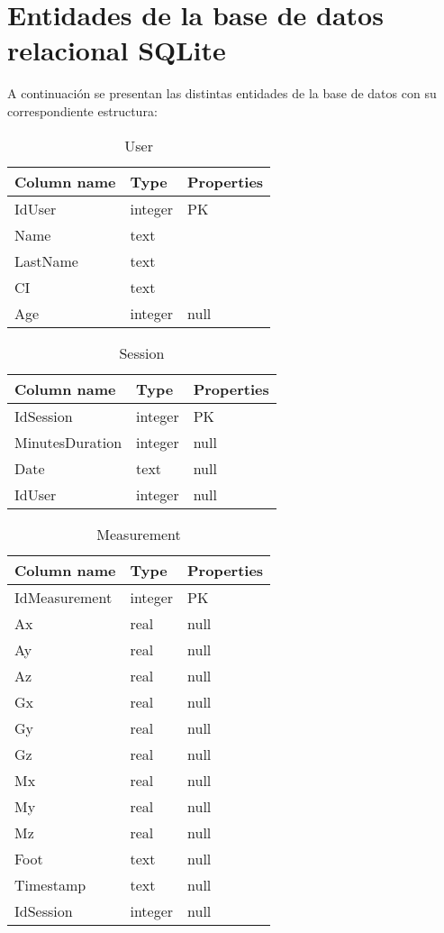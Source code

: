 \chapter{Entidades de la base de datos relacional SQLite}\label{anexo:db-tables}

A continuación se presentan las distintas entidades de la base de datos con su correspondiente estructura:

\begin{table}[H] 
\caption{User}
\centering
\begin{tabular}{| p{4cm} | p{3cm} | p{3cm}|}
\hline
\textbf{Column name} & \textbf{Type} & \textbf{Properties}  \\ \hline
IdUser & integer & PK  \\ \hline
Name & text &   \\ \hline
LastName & text &   \\ \hline
CI & text &   \\ \hline
Age & integer & null  \\ \hline
\end{tabular}
\end{table}

\begin{table}[H] 
\caption{Session}
\centering
\begin{tabular}{| p{4cm} | p{3cm} | p{3cm}|}
\hline
\textbf{Column name} & \textbf{Type} & \textbf{Properties}  \\ \hline
IdSession & integer & PK  \\ \hline
MinutesDuration & integer & null  \\ \hline
Date & text & null  \\ \hline
IdUser & integer & null  \\ \hline
\end{tabular}
\end{table}

\begin{table}[H] 
\caption{Measurement}
\centering
\begin{tabular}{| p{4cm} | p{3cm} | p{3cm}|}
\hline
\textbf{Column name} & \textbf{Type} & \textbf{Properties}  \\ \hline
IdMeasurement & integer & PK  \\ \hline
Ax & real & null  \\ \hline
Ay & real & null  \\ \hline
Az & real & null  \\ \hline
Gx & real & null  \\ \hline
Gy & real & null  \\ \hline
Gz & real & null  \\ \hline
Mx & real & null  \\ \hline
My & real & null  \\ \hline
Mz & real & null  \\ \hline
Foot & text & null  \\ \hline
Timestamp & text & null  \\ \hline
IdSession & integer & null  \\ \hline
\end{tabular}
\end{table}


